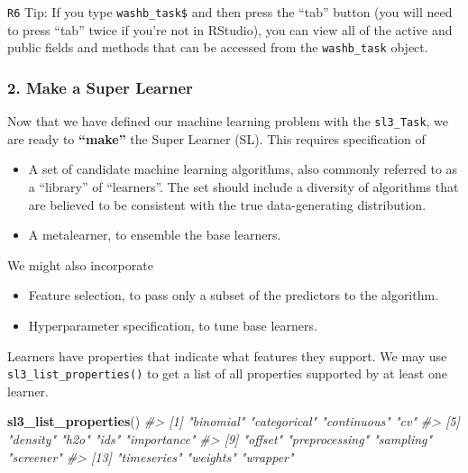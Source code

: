 \documentclass[12pt, krantz2,]{krantz}
\newenvironment{Shaded}{\begin{snugshade}}{\end{snugshade}}
\newcommand{\CommentTok}[1]{\textcolor[rgb]{0.37,0.37,0.37}{\textit{#1}}}
\newcommand{\KeywordTok}[1]{\textcolor[rgb]{0.27,0.27,0.27}{\textbf{#1}}}
\newcommand{\NormalTok}[1]{#1}
\providecommand{\tightlist}{%
  \setlength{\itemsep}{0pt}\setlength{\parskip}{0pt}}
\theoremstyle{definition}
\theoremstyle{definition}
\theoremstyle{definition}
\newcommand{\1}{\mathbbm{1}}
\begin{document}
\texttt{R6} Tip: If you type \texttt{washb\_task\$} and then press the ``tab'' button (you will
need to press ``tab'' twice if you're not in RStudio), you can view all of the
active and public fields and methods that can be accessed from the \texttt{washb\_task}
object.

\hypertarget{make-a-super-learner}{%
\subsubsection*{2. Make a Super Learner}\label{make-a-super-learner}}


Now that we have defined our machine learning problem with the \texttt{sl3\_Task}, we
are ready to \textbf{``make''} the Super Learner (SL). This requires specification of

\begin{itemize}
\tightlist
\item
  A set of candidate machine learning algorithms, also commonly referred to as
  a ``library'' of ``learners''. The set should include a diversity of algorithms
  that are believed to be consistent with the true data-generating
  distribution.
\item
  A metalearner, to ensemble the base learners.
\end{itemize}

We might also incorporate

\begin{itemize}
\tightlist
\item
  Feature selection, to pass only a subset of the predictors to the algorithm.
\item
  Hyperparameter specification, to tune base learners.
\end{itemize}

Learners have properties that indicate what features they support. We may use
\texttt{sl3\_list\_properties()} to get a list of all properties supported by at least
one learner.

\begin{Shaded}
\begin{Highlighting}[]
\KeywordTok{sl3_list_properties}\NormalTok{()}
\CommentTok{#>  [1] "binomial"      "categorical"   "continuous"    "cv"           }
\CommentTok{#>  [5] "density"       "h2o"           "ids"           "importance"   }
\CommentTok{#>  [9] "offset"        "preprocessing" "sampling"      "screener"     }
\CommentTok{#> [13] "timeseries"    "weights"       "wrapper"}
\end{Highlighting}
\end{Shaded}
\end{document}
